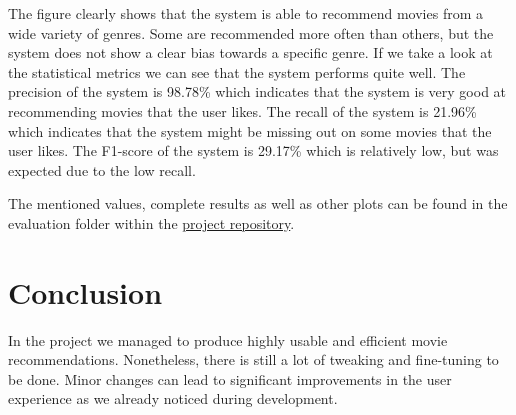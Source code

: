 \documentclass[12pt,a4paper]{article}
\begin{document}
\noindent The figure clearly shows that the system is able to recommend movies from a wide variety of genres.
Some are recommended more often than others, but the system does not show a clear bias towards a specific genre.
\newline \noindent If we take a look at the statistical metrics we can see that the system performs quite well.
The precision of the system is 98.78\% which indicates that the system is very good at recommending movies that the user likes.
The recall of the system is 21.96\% which indicates that the system might be missing out on some movies that the user likes.
The F1-score of the system is 29.17\% which is relatively low, but was expected due to the low recall.

The mentioned values, complete results as well as other plots can be found in the evaluation folder within the \href{https://github.com/IImpaq/air-2024/evaluation}{project repository}.

\section{Conclusion}

In the project we managed to produce highly usable and efficient movie recommendations.
Nonetheless, there is still a lot of tweaking and fine-tuning to be done.
Minor changes can lead to significant improvements in the user experience as we already noticed during development.
\end{document}
